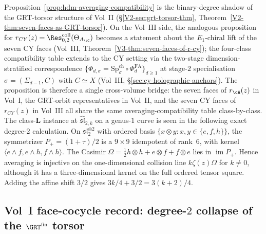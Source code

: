 \begin{remark}
\label{rem:hdm-averaging-compatibility-xvol}
Proposition~\ref{prop:hdm-averaging-compatibility} is the
binary-degree shadow of the GRT-torsor structure of Vol~II
(\S\ref{V2-sec:grt-torsor-thm}, Theorem~\ref{V2-thm:seven-faces-as-GRT-torsor}).
On the Vol~III side, the analogous proposition for
$r_{CY}(z) = \Res^{\mathrm{coll}}_{0,2}(\Theta_{A_\cC})$
becomes a statement about the $E_1$-chiral lift of the seven CY
faces (Vol~III,
Theorem~\ref{V3-thm:seven-faces-of-r-cy}); the four-class
compatibility table extends to the CY setting via the
two-stage dimension-stratified correspondence
$\{\Phi_{d,\sigma}=\mathrm{Sp}^{\mathrm{ch}}_{\sigma}\circ
\Phi^{\mathrm{FA}}_d\}_{d\ge 1}$ at stage-$2$ specialisation
$\sigma=(\Sigma_{d-1},C)$ with $C\simeq X$
(Vol~III, \S\ref{sec:cy-holographic-anchors}). The
proposition is therefore a single cross-volume bridge: the
seven faces of $r_\cA(z)$ in Vol~I, the GRT-orbit representatives
in Vol~II, and the seven CY faces of $r_{CY}(z)$ in Vol~III
all share the same averaging-compatibility table
class-by-class. The class-$\mathbf{L}$ instance at
$\widehat{\mathfrak{sl}}_{2,k}$ on a genus-$1$ curve is
seen in the following exact degree-$2$ calculation.  On
$\mathfrak{sl}_2^{\otimes2}$ with ordered basis
$\{x\otimes y:x,y\in\{e,f,h\}\}$, the symmetrizer
$P_+=(1+\tau)/2$ is a $9\times9$ idempotent of rank~$6$, with
kernel
$\langle e\wedge f,e\wedge h,f\wedge h\rangle$.  The Casimir
$\Omega=\tfrac12h\otimes h+e\otimes f+f\otimes e$ lies in
$\operatorname{im}P_+$.  Hence averaging is injective on the
one-dimensional collision line $k\zeta(z)\Omega$ for $k\ne0$,
although it has a three-dimensional kernel on the full ordered tensor
square.  Adding the affine shift $3/2$ gives
$3k/4+3/2=3(k+2)/4$.
\end{remark}

\subsection{Vol~I face-cocycle record: degree-$2$ collapse of the
\texorpdfstring{$\GRT^{\mathrm{fin}}$}{GRT-fin} torsor}
\label{subsec:hdm-grt-cocycle-record}

\providecommand{\Face}{\operatorname{Face}}
\providecommand{\fgrt}{\mathfrak{grt}}
\providecommand{\GRTone}{\operatorname{GRT}_{1}}

